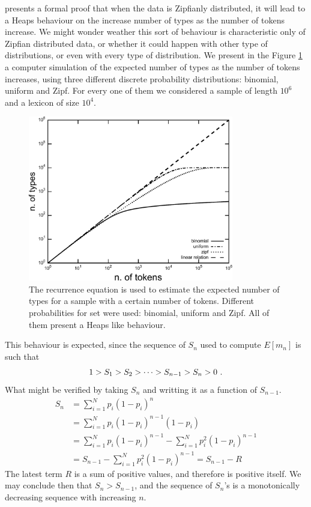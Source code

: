\cite{vanLeijenhorst} presents a formal proof that when the data is Zipfianly distributed,
it will lead to a Heaps behaviour on the increase number of types as the number of tokens
increase. We might wonder weather this sort of behaviour is characteristic only of Zipfian
distributed data, or whether it could happen with other type of distributions, or even with
every type of distribution. We present in the Figure \ref{fig:heapslaw_rdist} 
a computer simulation of the
expected number of types as the number of tokens increases, using three different discrete
probability distributions: binomial, uniform and Zipf. For every one of them we considered
a sample of length $10^6$ and a lexicon of size $10^4$.

\begin{figure}[htbp]
\centering
\includegraphics[width=0.8\textwidth]{images/heapslaw_rdist.pdf}
\caption{The recurrence equation is used to estimate the expected number of types for a sample with a certain number of tokens. Different probabilities for set were used: binomial, uniform and Zipf. All of them present a Heaps like behaviour.}
\label{fig:heapslaw_rdist}
\end{figure}

This behaviour is expected, since the sequence of $S_n$ used to compute $E[m_n]$ is such that
\begin{equation}
1 > S_1 > S_2 > \cdots > S_{n-1} > S_n > 0\textmd{ .}
\end{equation}
What might be verified by taking $S_n$ and writting it as a function of $S_{n-1}$.
\begin{align}
\label{eq:SnR}
S_n &= \sum_{i=1}^N p_i (1-p_i)^n \nonumber \\
    &= \sum_{i=1}^N p_i (1-p_i)^{n-1} (1 - p_i) \nonumber \\
    &= \sum_{i=1}^N p_i (1-p_i)^{n-1} - \sum_{i=1}^N p_i^2 (1-p_i)^{n-1} \nonumber \\
    &= S_{n-1} - \sum_{i=1}^N p_i^2 (1-p_i)^{n-1} = S_{n-1} - R
\end{align}
The latest term $R$ is a sum of positive values, and therefore is positive itself.
We may conclude then that $S_n > S_{n-1}$, and the sequence of $S_n$'s is a monotonically
decreasing sequence with increasing $n$.

